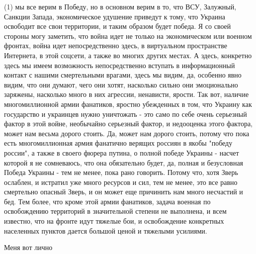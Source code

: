(1) мы все верим в Победу, но в основном верим в то, что ВСУ, Залужный, Санкции
Запада, экономическое удушение приведут к тому, что Украина освободит все свои
территории, и таким образом будет победа. Я со своей стороны могу заметить, что
война идет не только на экономическом или военном фронтах, война идет
непосредственно здесь, в виртуальном пространстве Интернета, в этой соцсети, а
также во многих других местах. А здесь, конкретно здесь мы имеем возможность
непосредственно вступать в информационный контакт с нашими смертельными
врагами, здесь мы видим, да, особенно явно видим, что они думают, чего они
хотят, насколько сильно они эмоционально заряжены, насколько много в них
агрессии, ненависти, ярости. Так вот, наличие многомиллионной армии фанатиков,
яростно убежденных в том, что Украину как государство и украинцев нужно
уничтожать - это само по себе очень серьезный фактор в этой войне, необычайно
серьезный фактор, и недооценка этого фактора, может нам весьма дорого стоить.
Да, может нам дорого стоить, потому что пока есть многомиллионная армия
фанатично верящих россиян в якобы "победу россии", а также в своего фюрера
путина, о полной победе Украины - насчет которой я не сомневаюсь, что она
обязательно будет, да, полная и безусловная Победа Украины - тем не менее, пока
рано говорить. Потому что, хотя Зверь ослаблен, и истратил уже много ресурсов и
сил, тем не менее, это все равно смертельно опасный Зверь, и он может еще
причинить нам много несчастий и бед.  Тем более, что кроме этой армии
фанатиков, задача военная по освобождению территорий в значительной степени не
выполнена, и всем известно, что на фронте идут тяжелые бои, и освобождение
конкретных населенных пунктов дается большой ценой и тяжелыми усилиями. 

Меня вот лично 
